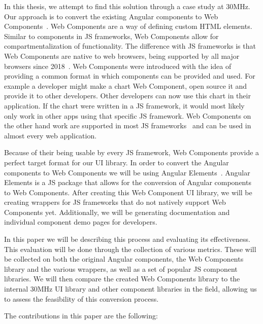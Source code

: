In this thesis, we attempt to find this solution through a case study at 30MHz. Our approach is to convert the existing Angular components to Web Components~. Web Components are a way of defining custom HTML elements. Similar to components in JS frameworks, Web Components allow for compartmentalization of functionality. The difference with JS frameworks is that Web Components are native to web browsers, being supported by all major browsers since 2018~. Web Components were introduced with the idea of providing a common format in which components can be provided and used. For example a developer might make a chart Web Component, open source it and provide it to other developers. Other developers can now use this chart in their application. If the chart were written in a JS framework, it would most likely only work in other apps using that specific JS framework. Web Components on the other hand work are supported in most JS frameworks~ and can be used in almost every web application.

Because of their being usable by every JS framework, Web Components provide a perfect target format for our UI library. In order to convert the Angular components to Web Components we will be using Angular Elements~. Angular Elements is a JS package that allows for the conversion of Angular components to Web Components. After creating this Web Component UI library, we will be creating wrappers for JS frameworks that do not natively support Web Components yet. Additionally, we will be generating documentation and individual component demo pages for developers.

In this paper we will be describing this process and evaluating its effectiveness. This evaluation will be done through the collection of various metrics. These will be collected on both the original Angular components, the Web Components library and the various wrappers, as well as a set of popular JS component libraries. We will then compare the created Web Components library to the internal 30MHz UI library and other component libraries in the field, allowing us to assess the feasibility of this conversion process.

The contributions in this paper are the following:

